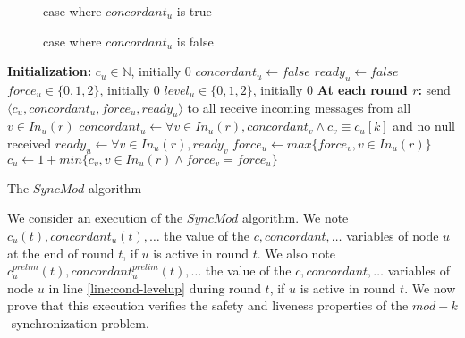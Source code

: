 \documentclass[11pt,letterpaper]{article}
\begin{document}
\begin{figure}[h]
    \centering
    \def\svgwidth{0.8\columnwidth}
	
	\caption{case where $concordant_u$ is true}
	\label{fig:fig1}
\end{figure}

\begin{figure}[h]
    \centering
    \def\svgwidth{0.8\columnwidth}
	
	\caption{case where $concordant_u$ is false}
	\label{fig:fig2}
\end{figure}


\begin{algorithm}[htb]
	\DontPrintSemicolon
	\textbf{Initialization:} \;
	\Indp
		$c_u \in \mathds{N}$, initially 0 \;
		$concordant_u \leftarrow false$ \;
		$ready_u \leftarrow false$ \;
		$force_u \in \{0, 1, 2\}$, initially 0 \;
		$level_u \in \{0, 1, 2\}$, initially 0 \;
	\BlankLine
	\Indm
	\textbf{At each round $r$:} \;
	\Indp
		send $\langle c_u, concordant_u, force_u, ready_u \rangle$ to all  \;
		receive incoming messages from all $v \in In_u(r)$ \;
		$concordant_u \leftarrow \forall v \in In_u(r), concordant_v \wedge c_v \equiv c_u [k]$ and no null received \; \label{line:conc-gossip}
		$ready_u \leftarrow \forall v \in In_u(r), ready_v$ \; \label{line:ready-gossip} 
		$force_u \leftarrow max \{force_v, v \in In_u(r) \}$ \;\label{line:force}
		$c_u \leftarrow 1+ min \{c_v, v \in In_u(r) \wedge force_v = force_u\}$ \;\label{line:min-z-end} 
	\Indm
\caption{The $SyncMod$ algorithm} 
\end{algorithm}

We consider an execution of the $SyncMod$ algorithm.
We note $c_u(t), concordant_u(t), \dots$ the value of the $c, concordant, \dots$ variables of node $u$ at the end of round $t$, if $u$ is active in round $t$.
We also note $c^{prelim}_u(t), concordant^{prelim}_u(t), \dots$ the value of the $c, concordant, \dots$ variables
of node $u$ in line \ref{line:cond-levelup} during round $t$, if $u$ is active in round $t$.
We now prove that this execution verifies the safety and liveness properties of the $mod-k$-synchronization problem.
\end{document}
